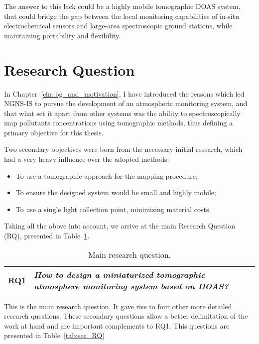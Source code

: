 The answer to this lack could be a highly mobile tomographic DOAS
system, that could bridge the gap between the local monitoring
capabilities of in-situ electrochemical sensors and large-area
spectroscopic ground stations, while maintaining portability and
flexibility.

\section{Research Question}%
\label{sec:research_question}

In Chapter~\ref{cha:bg_and_motivation}, I have introduced the reasons
which led NGNS-IS to pursue the development of an atmospheric monitoring
system, and that what set it apart from other systems was the ability to
spectroscopically map pollutants concentrations using tomographic
methods, thus defining a primary objective for this thesis.

Two secondary objectives were born from the necessary initial research,
which had a very heavy influence over the adopted methods:
\begin{itemize}
    \item To use a tomographic approach for the mapping procedure;
    \item To ensure the designed system would be small and highly
        mobile;
    \item To use a single light collection point, minimizing material
        costs.
\end{itemize}

Taking all the above into account, we arrive at the main Research
Question (\gls{RQ}), presented in Table~\ref{tab:RQ1}.
\begin{table}[htpb]
    \centering
    \caption{Main research question.}
    \label{tab:RQ1}
    \begin{tabularx}{0.8\textwidth}{cX}
        \toprule
        \textbf{RQ1}&\emph{ How to design a miniaturized tomographic
        atmosphere monitoring system based on DOAS? }\\
        \bottomrule
    \end{tabularx}
\end{table}

This is the main research question. It gave rise to four other more
detailed research questions. These secondary questions allow a better
delimitation of the work at hand and are important complements to RQ1.
This questions are presented in Table~\ref{tab:sec_RQ}

